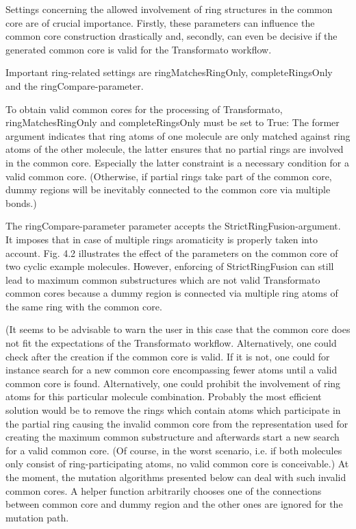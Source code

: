 Settings concerning the allowed involvement of ring structures in
the common core are of crucial importance. Firstly, these parameters
can influence the common core construction drastically and, secondly,
can even be decisive if the generated common core is valid for the
Transformato workflow.

Important ring-related settings are ringMatchesRingOnly, completeRingsOnly
and the ringCompare-parameter. 

To obtain valid common cores for the processing of Transformato, ringMatchesRingOnly
and completeRingsOnly must be set to True: The former argument indicates
that ring atoms of one molecule are only matched against ring atoms
of the other molecule, the latter ensures that no partial rings are
involved in the common core. Especially the latter constraint is a
necessary condition for a valid common core. (Otherwise, if partial
rings take part of the common core, dummy regions will be inevitably
connected to the common core via multiple bonds.)

The ringCompare-parameter parameter accepts the StrictRingFusion-argument.
It imposes that in case of multiple rings aromaticity is properly
taken into account. Fig. 4.2 illustrates the effect of the parameters
on the common core of two cyclic example molecules. However, enforcing
of StrictRingFusion can still lead to maximum common substructures
which are not valid Transformato common cores because a dummy region
is connected via multiple ring atoms of the same ring with the common
core.

(It seems to be advisable to warn the user in this case that the common
core does not fit the expectations of the Transformato workflow. Alternatively,
one could check after the creation if the common core is valid. If
it is not, one could for instance search for a new common core encompassing fewer
atoms until a valid common core is found. 
Alternatively, one could prohibit the involvement of ring atoms for this particular
molecule combination.
Probably the most efficient solution would be to remove the rings which contain atoms which participate in the partial ring causing the invalid common core from the representation used for creating the maximum common substructure and afterwards start a new search for a valid common core.
(Of course,
in the worst scenario, i.e. if both molecules only consist of ring-participating
atoms, no valid common core is conceivable.)
At the moment, the mutation algorithms presented below can deal with such invalid common cores. A helper function arbitrarily chooses one of the connections between common core and dummy region and the other ones are ignored for the mutation path.


